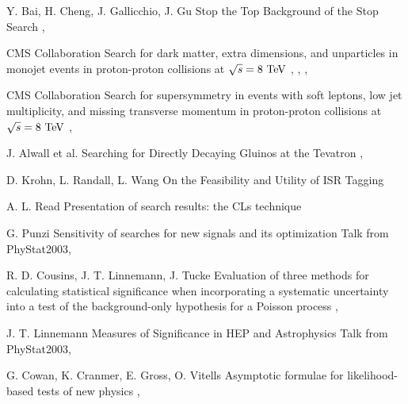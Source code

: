 {Y. Bai, H. Cheng, J. Gallicchio, J. Gu}
{Stop the Top Background of the Stop Search}
{, }


{CMS Collaboration}
{Search for dark matter, extra dimensions, and unparticles in monojet events in proton-proton collisions at $\sqrt{s} = 8~\text{TeV}$}
{, , , }

{CMS Collaboration}
{Search for supersymmetry in events with soft leptons, low jet multiplicity, and missing
transverse momentum in proton-proton collisions at $\sqrt{s} = 8~\text{TeV}$}
{, }

{J. Alwall et al.}
{Searching for Directly Decaying Gluinos at the Tevatron}
{, }

{D. Krohn, L. Randall, L. Wang}
{On the Feasibility and Utility of ISR Tagging}
{}


{A. L. Read}
{Presentation of search results: the CLs technique}
{}

{G. Punzi}
{Sensitivity of searches for new signals and its optimization}
{Talk from PhyStat2003, }

{R. D. Cousins, J. T. Linnemann, J. Tucke}
{Evaluation of three methods for calculating
statistical significance when incorporating a
systematic uncertainty into a test of the
background-only hypothesis for a Poisson
process}
{, }

{J. T. Linnemann}
{Measures of Significance in HEP and Astrophysics}
{Talk from PhyStat2003, }

{G. Cowan, K. Cranmer, E. Gross, O. Vitells}
{Asymptotic formulae for likelihood-based tests of new physics}
{, }


